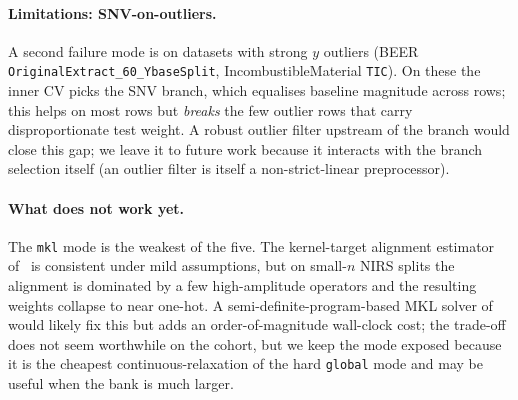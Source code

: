 \documentclass[11pt,a4paper]{article}
\begin{document}
\paragraph{Limitations: SNV-on-outliers.}
A second failure mode is on datasets with strong $y$ outliers
(BEER \texttt{OriginalExtract\_60\_YbaseSplit},
IncombustibleMaterial \texttt{TIC}). On these the inner CV picks the
SNV branch, which equalises baseline magnitude across rows; this
helps on most rows but \emph{breaks} the few outlier rows that carry
disproportionate test weight. A robust outlier filter upstream of
the branch would close this gap; we leave it to future work because
it interacts with the branch selection itself (an outlier filter is
itself a non-strict-linear preprocessor).

\paragraph{What does not work yet.}
The \texttt{mkl} mode is the weakest of the five. The kernel-target
alignment estimator of~\citet{cristianini2002kernel} is consistent
under mild assumptions, but on small-$n$ NIRS splits the alignment
is dominated by a few high-amplitude operators and the resulting
weights collapse to near one-hot. A semi-definite-program-based MKL
solver of~\citet{lanckriet2004learning} would likely fix this but
adds an order-of-magnitude wall-clock cost; the trade-off does not
seem worthwhile on the cohort, but we keep the mode exposed because
it is the cheapest continuous-relaxation of the hard \texttt{global}
mode and may be useful when the bank is much larger.
\end{document}
